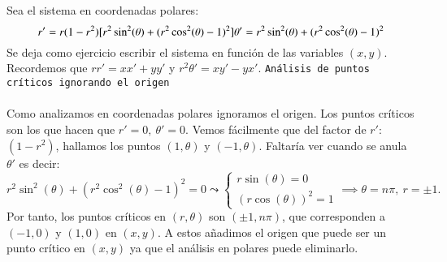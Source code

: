 \begin{eg}
    Sea el sistema en coordenadas polares:
    $$
        r' = r(1-r^2) [r^2 \sin^2(\theta) + (r^2\cos^2(\theta) -1 )^2]\\
        \theta' = r^2 \sin^2(\theta) + (r^2\cos^2(\theta) -1 )^2
    $$
    Se deja como ejercicio escribir el sistema en función de las variables $(x, y)$. Recordemos que $rr' = xx' + yy'$ y $r^2\theta' = xy' - yx'$.
    \texttt{Análisis de puntos críticos ignorando el origen}\\\\
    Como analizamos en coordenadas polares ignoramos el origen. Los puntos críticos son los que hacen que $r' = 0,\ \theta' = 0$. Vemos fácilmente que del factor de $r'$: $(1-r^2)$, hallamos los puntos $(1, \theta)$ y $(-1, \theta)$. Faltaría ver cuando se anula $\theta'$ es decir:
    $$
        r^2 \sin^2(\theta) + (r^2\cos^2(\theta) -1 )^2 = 0 \leadsto
            \begin{cases}
                r\sin(\theta) = 0\\
                (r\cos(\theta))^2 = 1
            \end{cases} \implies \theta = n\pi,\ r = \pm 1.
    $$
    Por tanto, los puntos críticos en $(r, \theta)$ son $(\pm 1, n \pi)$, que corresponden a $(-1, 0)$ y $(1, 0)$ en $(x, y)$. A estos añadimos el origen que puede ser un punto crítico en $(x, y)$ ya que el análisis en polares puede eliminarlo.

\end{eg}
